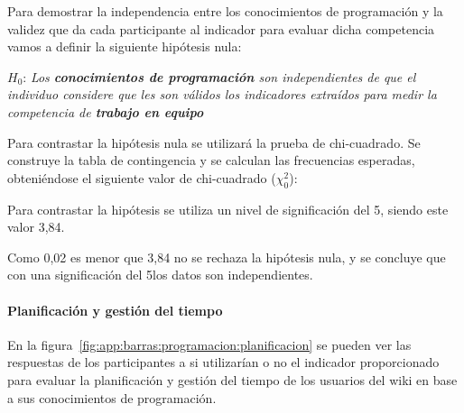 Para demostrar la independencia entre los conocimientos de programación y la validez que da cada participante al indicador para evaluar dicha competencia vamos a definir la siguiente hipótesis nula:

\begin{mdframed}[style=hipotesis0]
$H_0$: \emph{Los \textbf{conocimientos de programación} son independientes de que el individuo considere que les son válidos los indicadores extraídos para medir la competencia de \textbf{trabajo en equipo}}
\end{mdframed}

Para contrastar la hipótesis nula se utilizará la prueba de chi-cuadrado. Se construye la tabla de contingencia y se calculan las frecuencias esperadas, obteniéndose el siguiente valor de chi-cuadrado ($\chi^2_0$): 

\begin{center}
\end{center}

Para contrastar la hipótesis se utiliza un nivel de significación del 5\percentage, siendo este valor 3,84. 

\begin{center}
\end{center}

Como 0,02 es menor que 3,84 no se rechaza la hipótesis nula, y se concluye que con una significación del 5\percentage{ }los datos son independientes.

\begin{center}
\end{center}

\paragraph*{Planificación y gestión del tiempo}

En la figura~\ref{fig:app:barras:programacion:planificacion} se pueden ver las respuestas de los participantes a si utilizarían o no el indicador proporcionado para evaluar la planificación y gestión del tiempo de los usuarios del wiki en base a sus conocimientos de programación.

